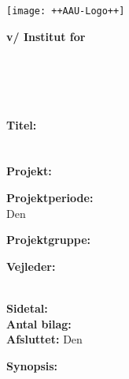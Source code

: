 

\cleardoublepage
{}
{}
\thispagestyle{empty}

\begin{minipage}[t]{0.48\textwidth}
\vspace*{-25pt}
\texttt{[image: ++AAU-Logo++]}
\end{minipage}
\hfill
\begin{minipage}[t]{0.48\textwidth}
{\small 
\textbf{v/ Institut for\\
\institutionname}\\
\studyname\\
\adress\\
\city\\
}
\end{minipage}
%
\vspace*{1cm}
%
\begin{minipage}[t]{0.48\textwidth}
\textbf{Titel:} \\[5pt]\bigskip\hspace{2ex}
\projectname\vspace{-2.75ex}\\\bigskip\hspace{2ex}
\projectnameextension\\
%
\textbf{Projekt:} \\[5pt]\bigskip\hspace{2ex}
\semestername

\textbf{Projektperiode:} \\[5pt]\bigskip\hspace{2ex}
Den \projectperiod

\textbf{Projektgruppe:} \\[5pt]\bigskip\hspace{2ex}
\groupname


\textbf{Vejleder:} \\[5pt]\hspace*{2ex}
\supervisor \\\hspace*{2ex}

\textbf{Sidetal:} \numberofpages \\ %
\textbf{Antal bilag:} \numberofappendix \\ %
\textbf{Afsluttet:} Den \finishdate\ \finishyear
\end{minipage}
%
\begin{minipage}[t]{0.483\textwidth}
\textbf{Synopsis:} \\[5pt]
\fbox{\parbox{7cm}{\bigskip\bigskip}}
\end{minipage}

